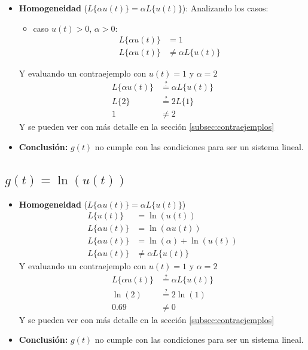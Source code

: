 \documentclass[12pt,a4paper]{article}
\begin{document}
\begin{itemize}
    \item \textbf{Homogeneidad} ($L\{\alpha u(t)\} = \alpha L\{u(t)\}$): Analizando los casos:
    \begin{itemize}
        \item caso $u(t) > 0$, $\alpha > 0$: 
        \begin{align*}
            L\{\alpha u(t)\} &=  1\\
            L\{\alpha u(t)\} &\neq \alpha L\{ u(t)\}
        \end{align*}
    \end{itemize}
    Y evaluando un contraejemplo con $u(t) = 1$ y $\alpha = 2$
    \begin{align*}
        L\{\alpha u(t)\} &\stackrel{?}{=} \alpha L\{ u(t)\}\\
        L\{2\} &\stackrel{?}{=} 2 L\{ 1\}\\
        1 &\neq 2
    \end{align*}
    Y se pueden ver con más detalle en la sección \ref{subsec:contraejemplos}
    \item \textbf{Conclusión:} $g(t)$ no cumple con las condiciones para ser un sistema lineal.

\end{itemize}

\subsection{$g(t)=\ln(u(t))$}

\begin{itemize}
    \item \textbf{Homogeneidad} ($L\{\alpha u(t)\} = \alpha L\{u(t)\}$)
    \begin{align*}
        L\{u(t)\} &= \ln(u(t))\\
        L\{\alpha u(t)\} &= \ln(\alpha u(t))\\
        L\{\alpha u(t)\} &= \ln(\alpha) + \ln(u(t))\\
        L\{\alpha u(t)\} &\neq \alpha L\{u(t)\}
    \end{align*}
    Y evaluando un contraejemplo con $u(t) = 1$ y $\alpha = 2$
    \begin{align*}
        L\{\alpha u(t)\} &\stackrel{?}{=} \alpha L\{ u(t)\}\\
        \ln(2) &\stackrel{?}{=} 2 \ln(1)\\
        0.69 &\neq 0
    \end{align*}
    Y se pueden ver con más detalle en la sección \ref{subsec:contraejemplos}
    \item \textbf{Conclusión:} $g(t)$ no cumple con las condiciones para ser un sistema lineal.
\end{itemize}
\end{document}
